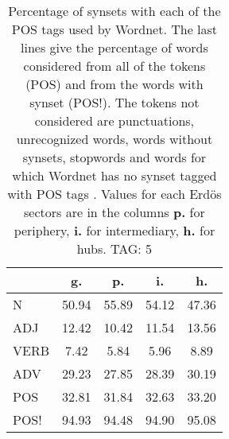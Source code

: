 \begin{table}[h!]
\begin{center}
\begin{tabular}{| l || c | c | c | c |}\hline
 & {\bf g.} & {\bf p.} & {\bf i.} & {\bf h.} \\\hline\hline
N & 50.94  & 55.89  & 54.12  & 47.36 \\\hline
ADJ & 12.42  & 10.42  & 11.54  & 13.56 \\\hline
VERB & 7.42  & 5.84  & 5.96  & 8.89 \\\hline
ADV & 29.23  & 27.85  & 28.39  & 30.19 \\\hline\hline
POS & 32.81  & 31.84  & 32.63  & 33.20 \\\hline
POS! & 94.93  & 94.48  & 94.90  & 95.08 \\\hline
\end{tabular}
\caption{Percentage of synsets with each of the POS tags used by Wordnet. The last lines give the percentage of words considered from all of the tokens (POS) and from the words with synset (POS!). The tokens not considered are punctuations, unrecognized words, words without synsets, stopwords and words for which Wordnet has no synset  tagged with POS tags . Values for each Erd\"os sectors are in the columns {{\bf p.}} for periphery, {{\bf i.}} for intermediary, {{\bf h.}} for hubs. TAG: 5}
\end{center}
\end{table}